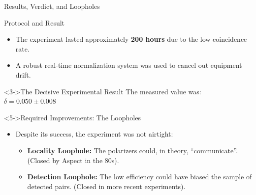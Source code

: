 \begin{frame}{Results, Verdict, and Loopholes}
  
  \begin{block}{Protocol and Result}
    \begin{itemize}[<+->]
      \item The experiment lasted approximately \textbf{200 hours} due to the low coincidence rate.
      \item A robust real-time normalization system was used to cancel out equipment drift.
    \end{itemize}
  \end{block}
  
  \begin{alertblock}<3->{The Decisive Experimental Result}
    \centering
    The measured value was:
    $\delta = 0.050 \pm 0.008$
  \end{alertblock}
  \pause

  \begin{block}<5->{Required Improvements: The Loopholes}
    \begin{itemize}[<+->]
      \item Despite its success, the experiment was not airtight:
      \begin{itemize}
          \item \textbf{Locality Loophole:} The polarizers could, in theory, ``communicate''. (Closed by Aspect in the 80s).
          \item \textbf{Detection Loophole:} The low efficiency could have biased the sample of detected pairs. (Closed in more recent experiments).
      \end{itemize}
    \end{itemize}
  \end{block}

\end{frame}
